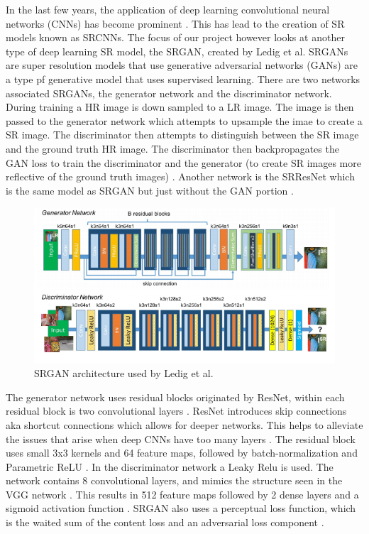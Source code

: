 \documentclass[11pt,titlepage]{article}
\begin{document}
\bigskip

In the last few years, the application of deep learning convolutional neural networks (CNNs) has become prominent \cite{Yang2019}. This has lead to the creation of SR models known as SRCNNs. The focus of our project however looks at another type of deep learning SR model, the SRGAN, created by Ledig et al. \cite{Ledig2017} SRGANs are super resolution models that use generative adversarial networks (GANs) are a type pf generative model that uses supervised learning. There are two networks associated SRGANs, the generator network and the discriminator network. During training a HR image is down sampled to a LR image. The image is then passed to the generator network which attempts to upsample the imae to create a SR image. The discriminator then attempts to distinguish between the SR image and the ground truth HR image. The discriminator then backpropagates the GAN loss to train the discriminator and the generator (to create SR images more reflective of the ground truth images) \cite{Hui2018}. Another network is the SRResNet which is the same model as SRGAN but just without the GAN portion \cite{Hui2018}. 

\begin{figure}[hp]
  \centering
  \includegraphics[width=\linewidth]{srgan_arch.png}
  \caption{SRGAN architecture used by Ledig et al. \cite{Ledig2017}}
  \label{fig:srgan}
\end{figure}

\bigskip
The generator network uses residual blocks originated by ResNet, within  each residual block is two convolutional layers \cite{Hui2018}. ResNet introduces skip connections aka shortcut connections which allows for deeper networks. This helps to alleviate the issues that arise when deep CNNs have too many layers \cite{Tsang2018}. The residual block uses small 3x3 kernels and 64 feature maps, followed by batch-normalization and Parametric ReLU \cite{Hui2018}. In the discriminator network a Leaky Relu is used. The network contains 8 convolutional layers, and mimics the structure seen in the VGG network \cite{Hui2018}. This results in 512 feature maps followed by 2 dense layers and a sigmoid activation function \cite{Hui2018}. SRGAN also uses a perceptual loss function, which is the waited sum of the content loss and an adversarial loss component \cite{Hui2018}.
\end{document}
